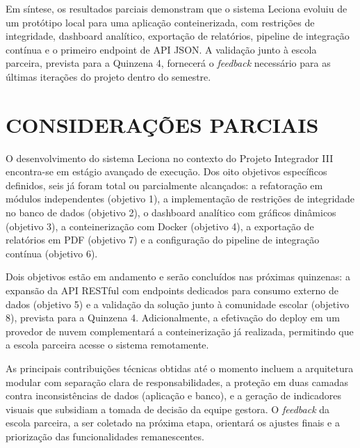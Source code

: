 Em síntese, os resultados parciais demonstram que o sistema Leciona evoluiu de um protótipo local para uma aplicação conteinerizada, com restrições de integridade, dashboard analítico, exportação de relatórios, pipeline de integração contínua e o primeiro endpoint de API JSON. A validação junto à escola parceira, prevista para a Quinzena 4, fornecerá o \textit{feedback} necessário para as últimas iterações do projeto dentro do semestre.


\section[Considerações parciais]{CONSIDERAÇÕES PARCIAIS}

O desenvolvimento do sistema Leciona no contexto do Projeto Integrador III encontra-se em estágio avançado de execução. Dos oito objetivos específicos definidos, seis já foram total ou parcialmente alcançados: a refatoração em módulos independentes (objetivo 1), a implementação de restrições de integridade no banco de dados (objetivo 2), o dashboard analítico com gráficos dinâmicos (objetivo 3), a conteinerização com Docker (objetivo 4), a exportação de relatórios em PDF (objetivo 7) e a configuração do pipeline de integração contínua (objetivo 6).

Dois objetivos estão em andamento e serão concluídos nas próximas quinzenas: a expansão da API RESTful com endpoints dedicados para consumo externo de dados (objetivo 5) e a validação da solução junto à comunidade escolar (objetivo 8), prevista para a Quinzena 4. Adicionalmente, a efetivação do deploy em um provedor de nuvem complementará a conteinerização já realizada, permitindo que a escola parceira acesse o sistema remotamente.

As principais contribuições técnicas obtidas até o momento incluem a arquitetura modular com separação clara de responsabilidades, a proteção em duas camadas contra inconsistências de dados (aplicação e banco), e a geração de indicadores visuais que subsidiam a tomada de decisão da equipe gestora. O \textit{feedback} da escola parceira, a ser coletado na próxima etapa, orientará os ajustes finais e a priorização das funcionalidades remanescentes.
